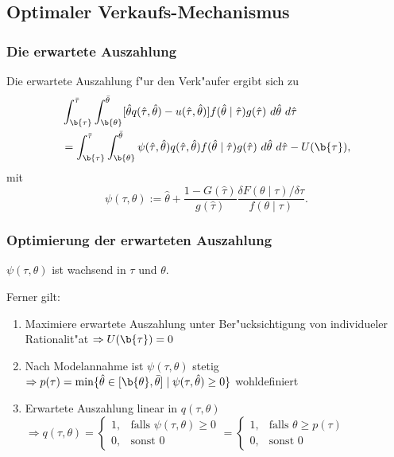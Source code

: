 \subsection{Optimaler Verkaufs-Mechanismus}
\begin{frame}
  \frametitle{Die erwartete Auszahlung}
  \justifying
  \begin{thmL}
    Die erwartete Auszahlung f"ur den Verk"aufer ergibt sich zu
    \begin{align*}
      &\int_{\b{\tau}}^{\bar{\tau}} \int_{\b{\theta}}^{\bar{\theta}} [\hat{\theta} q(\hat{\tau}, \hat{\theta}) - u(\hat{\tau}, \hat{\theta})]
      f(\hat{\theta} \mid \hat{\tau} ) g(\hat{\tau}) \ d \hat{\theta} \ d \hat{\tau} \\
      &= \int_{\b{\tau}}^{\bar{\tau}} \int_{\b{\theta}}^{\bar{\theta}} \psi(\hat{\tau}, \hat{\theta}) q(\hat{\tau}, \hat{\theta})
      f(\hat{\theta} \mid \hat{\tau}) g(\hat{\tau}) \ d \hat{\theta} \ d \hat{\tau} - U(\b{\tau}),
    \end{align*}
    mit
    \begin{equation*}
      \psi(\tau, \theta) := \hat{\theta} + \dfrac{1-G(\hat{\tau})}{g(\hat{\tau})} \dfrac{ \delta F(\theta \mid \tau) / \delta \tau}{f(\theta \mid \tau)}.
    \end{equation*}
  \end{thmL}
\end{frame}

\begin{frame}
  \frametitle{Optimierung der erwarteten Auszahlung}
  \justifying
  \begin{thmA}
    $\psi(\tau, \theta)$ ist wachsend in $\tau$ und $\theta$.
  \end{thmA}
    Ferner gilt:
    \begin{enumerate}
      \item Maximiere erwartete Auszahlung unter Ber"ucksichtigung von individueler Rationalit"at
      $\Rightarrow U(\b{\tau}) = 0$
      \item Nach Modelannahme ist $\psi(\tau, \theta)$ stetig $\Rightarrow p(\tau) = \min \{\hat{\theta} \in [\b{\theta}, \bar{\theta}] \mid \psi(\tau, \hat{\theta}) \ge 0 \}$
      wohldefiniert
      \item Erwartete Auszahlung linear in $q(\tau, \theta)$
      $\Rightarrow q(\tau, \theta) = \left\{\begin{array}{lr}
        1, & \text{falls } \psi(\tau, \theta) \ge 0 \\
        0, & \text{sonst } 0
        \end{array} = \left\{\begin{array}{lr}
          1, & \text{falls } \theta \ge p(\tau) \\
          0, & \text{sonst } 0
          \end{array}$
    \end{enumerate}
\end{frame}

